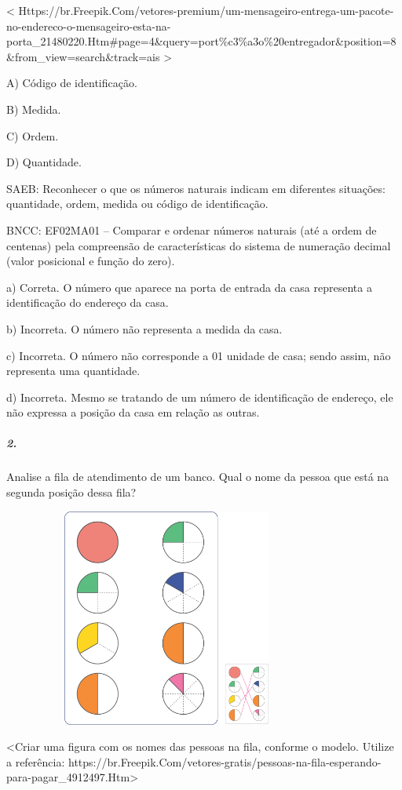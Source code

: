 \textless{}
Https://br.Freepik.Com/vetores-premium/um-mensageiro-entrega-um-pacote-no-endereco-o-mensageiro-esta-na-porta\_21480220.Htm\#page=4\&query=port\%c3\%a3o\%20entregador\&position=8\&from\_view=search\&track=ais
\textgreater{}

A) Código de identificação.

B) Medida.

C) Ordem.

D) Quantidade.

SAEB: Reconhecer o que os números naturais indicam em diferentes
situações: quantidade, ordem, medida ou código de identificação.

BNCC: EF02MA01 -- Comparar e ordenar números naturais (até a ordem de
centenas) pela compreensão de características do sistema de numeração
decimal (valor posicional e função do zero).

a) Correta. O número que aparece na porta de entrada da casa representa
a identificação do endereço da casa.

b) Incorreta. O número não representa a medida da casa.

c) Incorreta. O número não corresponde a 01 unidade de casa; sendo assim, não representa uma quantidade.

d) Incorreta. Mesmo se tratando de um número de identificação de
endereço, ele não expressa a posição da casa em relação as outras.

\subparagraph{2. }\label{section-101}

Analise a fila de atendimento de um banco. Qual o nome da pessoa que
está na segunda posição dessa fila?

\includegraphics[width=4.25000in,height=2.83333in]{media/image106.png}

\textless{}Criar uma figura com os nomes das pessoas na fila, conforme o
modelo. Utilize a referência:
https://br.Freepik.Com/vetores-gratis/pessoas-na-fila-esperando-para-pagar\_4912497.Htm\textgreater{}

